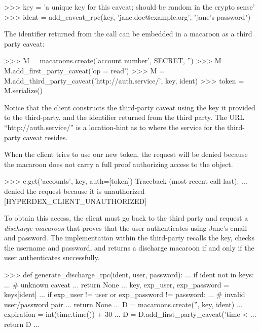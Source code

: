 \begin{pythoncode}
>>> key = 'a unique key for this caveat; should be random in the crypto sense'
>>> ident = add_caveat_rpc(key, 'jane.doe@example.org', "jane's password")
\end{pythoncode}

The identifier returned from the  call can be embedded in
a macaroon as a third party caveat:

\begin{pythoncode}
>>> M = macaroons.create('account number', SECRET, '')
>>> M = M.add_first_party_caveat('op = read')
>>> M = M.add_third_party_caveat('http://auth.service/', key, ident)
>>> token = M.serialize()
\end{pythoncode}

Notice that the client constructs the third-party caveat using the key it
provided to the third-party, and the identifier returned from the third party.
The URL ``http://auth.service/'' is a location-hint as to where the service for
the third-party caveat resides.

When the client tries to use our new token, the request will be denied because
the macaroon does not carry a full proof authorizing access to the object.

\begin{pythoncode}
>>> c.get('accounts', key, auth=[token])
Traceback (most recent call last):
... denied the request because it is unauthorized [HYPERDEX_CLIENT_UNAUTHORIZED]
\end{pythoncode}

To obtain this access, the client must go back to the third party and request a
{\em discharge macaroon} that proves that the user authenticates using Jane's
email and password.  The implementation within the third-party recalls the key,
checks the username and password, and returns a discharge macaroon if and only
if the user authenticates successfully.

\begin{pythoncode}
>>> def generate_discharge_rpc(ident, user, password):
...     if ident not in keys:
...         # unknown caveat
...         return None
...     key, exp_user, exp_password = keys[ident]
...     if exp_user != user or exp_password != password:
...         # invalid user/password pair
...         return None
...     D = macaroons.create('', key, ident)
...     expiration = int(time.time()) + 30
...     D = D.add_first_party_caveat('time < %
...     return D
...
\end{pythoncode}

